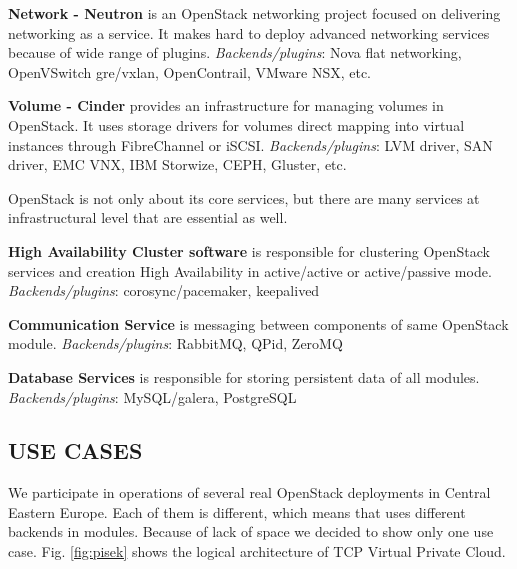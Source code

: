 \textbf{Network - Neutron} is an OpenStack networking project focused on delivering networking as a service. It makes hard to deploy advanced networking services because of wide range of plugins.
\textit{Backends/plugins}: Nova flat networking, OpenVSwitch gre/vxlan, OpenContrail, VMware NSX, etc.

\textbf{Volume - Cinder} provides an infrastructure for managing volumes in OpenStack. It uses storage drivers for volumes direct mapping into virtual instances through FibreChannel or iSCSI. 
\textit{Backends/plugins}: LVM driver, SAN driver, EMC VNX, IBM Storwize, CEPH, Gluster, etc.

OpenStack is not only about its core services, but there are many services at infrastructural level that are essential as well.

\textbf{High Availability Cluster software} is responsible for clustering OpenStack services and creation High Availability in active/active or active/passive mode.
\textit{Backends/plugins}: corosync/pacemaker, keepalived

\textbf{Communication Service} is messaging between components of same OpenStack module.
\textit{Backends/plugins}: RabbitMQ, QPid, ZeroMQ

\textbf{Database Services} is responsible for storing persistent data of all modules.
\textit{Backends/plugins}: MySQL/galera, PostgreSQL


\subsection{USE CASES}

We participate in operations of several real OpenStack deployments in Central Eastern Europe. Each of them is different, which means that uses different backends in modules.
Because of lack of space we decided to show only one use case. Fig. \ref{fig:pisek} shows the logical architecture of TCP Virtual Private Cloud.


